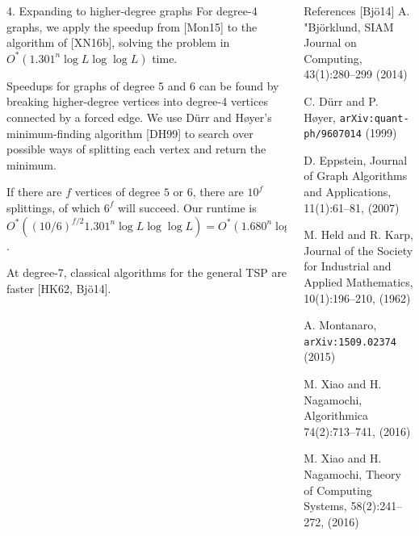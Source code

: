 \documentclass[]{templates/poster}
\begin{document}
\begin{frame}{}
\begin{columns}[t]
\begin{column}{0.422\linewidth}
\begin{block}{\Large 4. Expanding to higher-degree graphs}
  For degree-4 graphs, we apply the speedup from [Mon15] to the algorithm of [XN16b], solving the problem in $O^*(1.301^n\log L \log\log L)$ time.
  
  Speedups for graphs of degree 5 and 6 can be found by breaking higher-degree vertices into degree-4 vertices connected by a forced edge. We use D\"urr and H\o yer's minimum-finding algorithm [DH99] to search over possible ways of splitting each vertex and return the minimum.
  
  If there are $f$ vertices of degree $5$ or $6$, there are $10^f$ splittings, of which $6^f$ will succeed. Our runtime is  $O^*((10/6)^{f/2}1.301^n\log L\log\log L) = O^*(1.680^n\log L\log\log L)$.

  At degree-7, classical algorithms for the general TSP are faster [HK62, Bj\"o14].
  \end{block}
  \end{column}

  \begin{column}{0.422\linewidth}
  \begin{block}{\Large References}
  [Bj\"o14] A. "Bj{\"o}rklund, SIAM Journal on Computing, 43(1):280--299 (2014)

  \noindent[DH99] C. D\"urr and P. H\o yer, {\tt arXiv:quant-ph/9607014} (1999)

  \noindent[Epp07] D. Eppstein, Journal of Graph Algorithms and Applications, 11(1):61--81, (2007)

  \noindent[HK62] M. Held and R. Karp, Journal of the Society for Industrial and Applied Mathematics, 10(1):196--210, (1962)

  \noindent[Mon15] A. Montanaro, {\tt arXiv:1509.02374} (2015)

  \noindent[XN16a] M. Xiao and H. Nagamochi, Algorithmica 74(2):713--741, (2016)

  \noindent[XN16b] M. Xiao and H. Nagamochi, Theory of Computing Systems, 58(2):241--272, (2016)
  \end{block}
  \end{column}
\end{columns}

\end{frame}

\end{document}
